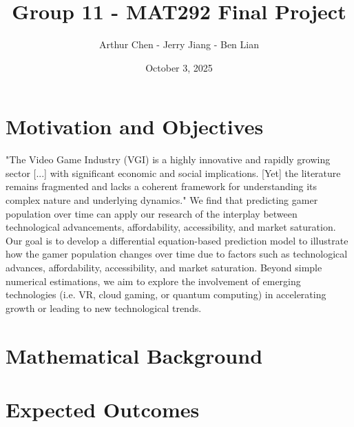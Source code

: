 \documentclass{article}
\title{\vspace{-4cm}Group 11 - MAT292 Final Project}
\author{Arthur Chen - Jerry Jiang - Ben Lian}
\date{October 3, 2025}
\begin{document}
\maketitle

\section{Motivation and Objectives}
"The Video Game Industry (VGI) is a highly innovative and rapidly growing 
sector [...] with significant economic and social implications. [Yet] the 
literature remains fragmented and lacks a coherent framework for 
understanding its complex nature and underlying dynamics." \cite{Goh2023} 
We find that predicting gamer population over time can apply our research 
of the interplay between technological advancements, affordability, 
accessibility, and market saturation.\\

\noindent Our goal is to develop a differential equation-based prediction
model to illustrate how the gamer population changes over time due to
factors such as technological advances, affordability, accessibility, and
market saturation. Beyond simple numerical estimations, we aim to 
explore the involvement of emerging technologies (i.e. VR, cloud gaming, or 
quantum computing) in accelerating growth or leading to new technological 
trends.

\section{Mathematical Background}



\section{Expected Outcomes}




\end{document}
